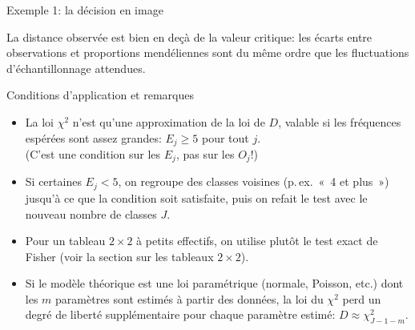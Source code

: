\documentclass{BeamerTemplate}
\begin{document}
\begin{frame}[t]{Exemple 1: la décision en image}

\begin{center}
\end{center}

\small
La distance observée est bien en deçà de la valeur critique: les écarts entre
observations et proportions mendéliennes sont du même ordre que les fluctuations
d'échantillonnage attendues.

\end{frame}

\begin{frame}[t]{Conditions d'application et remarques}

\begin{itemize}\itemsep2mm
  \item La loi $\chi^2$ n'est qu'une \alert{approximation} de la loi de $D$,
  valable si les \alert{fréquences espérées} sont assez grandes:
  \alert{$E_j\ge5$ pour tout $j$}. \\
  {\small (C'est une condition sur les $E_j$, pas sur les $O_j$!)}
  \item<2-> Si certaines $E_j<5$, on \alert{regroupe des classes voisines}
  (p.\,ex.\ «~4 et plus~») jusqu'à ce que la condition soit satisfaite, puis on
  refait le test avec le nouveau nombre de classes $J$.
  \item<3-> Pour un tableau $2\times2$ à petits effectifs, on utilise plutôt le
  \alert{test exact de Fisher} (voir la section sur les tableaux $2\times2$).
  \item<4-> Si le modèle théorique est une loi paramétrique (normale, Poisson, etc.)
  dont les $m$ paramètres sont estimés à partir des données, la loi du $\chi^2$ perd
  un \alert{degré de liberté supplémentaire} pour chaque paramètre estimé:
  $D\approx\chi^2_{J-1-m}$.
\end{itemize}

\end{frame}
\end{document}
